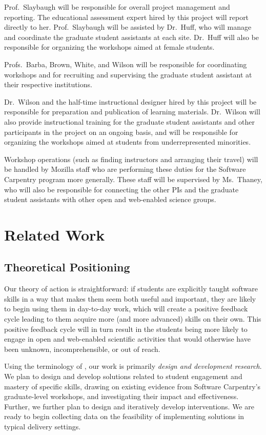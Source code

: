 \documentclass{proposalnsf}
\newlength{\up}
\begin{document}
Prof.\ Slaybaugh will be responsible for overall project management
and reporting.  The educational assessment expert hired by this
project will report directly to her.  Prof.\ Slaybaugh will be
assisted by Dr.\ Huff, who will manage and coordinate the graduate
student assistants at each site.  Dr.\ Huff will also be responsible
for organizing the workshops aimed at female students.

Profs.\ Barba, Brown, White, and Wilson will be responsible for
coordinating workshops and for recruiting and supervising the graduate
student assistant at their respective institutions.

Dr.\ Wilson and the half-time instructional designer hired by this
project will be responsible for preparation and publication of
learning materials.  Dr.\ Wilson will also provide instructional
training for the graduate student assistants and other participants in
the project on an ongoing basis, and will be responsible for
organizing the workshops aimed at students from underrepresented
minorities.

Workshop operations (such as finding instructors and arranging their
travel) will be handled by Mozilla staff who are performing these
duties for the Software Carpentry program more generally.  These staff
will be supervised by Ms.\ Thaney, who will also be responsible for
connecting the other PIs and the graduate student assistants with
other open and web-enabled science groups.

\section{Related Work}

\subsection{Theoretical Positioning}

Our theory of action is straightforward: if students are explicitly
taught software skills in a way that makes them seem both useful and
important, they are likely to begin using them in day-to-day work,
which will create a positive feedback cycle leading to them acquire
more (and more advanced) skills on their own. This positive feedback
cycle will in turn result in the students being more likely to engage
in open and web-enabled scientific activities that would otherwise
have been unknown, incomprehensible, or out of reach.

Using the terminology of \cite{guidelines}, our work is primarily
\emph{design and development research}. We plan to design and develop
solutions related to student engagement and mastery of specific
skills, drawing on existing evidence from Software Carpentry's
graduate-level workshops, and investigating their impact and
effectiveness. Further, we further plan to design and iteratively
develop interventions. We are ready to begin collecting data on the
feasibility of implementing solutions in typical delivery settings.
\end{document}
